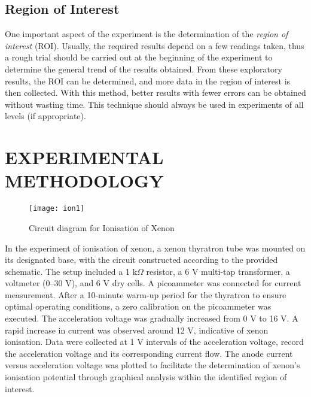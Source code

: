 \documentclass[a4paper,11pt]{article}
\begin{document}
\subsection*{Region of Interest}
One important aspect of the experiment is the determination of the \textit{region of interest} (ROI). Usually, the required results depend on a few readings taken, thus a rough trial should be carried out at the beginning of the experiment to determine the general trend of the results obtained. From these exploratory results, the ROI can be determined, and more data in the region of interest is then collected. With this method, better results with fewer errors can be obtained without wasting time. This technique should always be used in experiments of all levels (if appropriate).

\newpage

\section*{\center EXPERIMENTAL METHODOLOGY}
\label{sec:EXPERIMENTAL METHODOLOGY}
\begin{figure}[htbp]
\centering
\texttt{[image: ion1]}
\caption{Circuit diagram for Ionisation of Xenon}
\label{6}
\end{figure}
\quad In the experiment of ionisation of xenon, a xenon thyratron tube was mounted on its designated base, with the circuit constructed according to the provided schematic. The setup included a 1 k$\Omega$ resistor, a 6 V multi-tap transformer, a voltmeter (0--30 V), and 6 V dry cells. A picoammeter was connected for current measurement. After a 10-minute warm-up period for the thyratron to ensure optimal operating conditions, a zero calibration on the picoammeter was executed. The acceleration voltage was gradually increased from 0 V to 16 V. A rapid increase in current was observed around 12 V, indicative of xenon ionisation. Data were collected at 1 V intervals of the acceleration voltage, record the acceleration voltage and its corresponding current flow. The anode current versus acceleration voltage was plotted to facilitate the determination of xenon's ionisation potential through graphical analysis within the identified region of interest.\\
\end{document}
